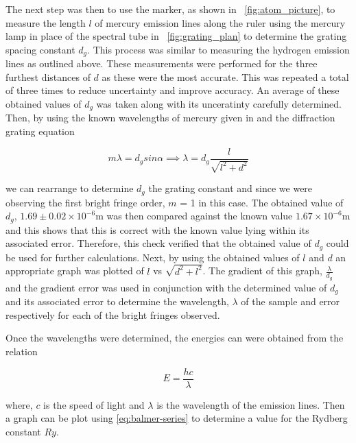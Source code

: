 \documentclass{article}
\newcommand{\figref}[2][\figurename~]{#1\ref{#2}}
\begin{document}
\vspace{2mm}
\noindent
The next step was then to use the marker, as shown in \figref{fig:atom_picture}, to measure the length $l$ of mercury emission lines along the ruler using the mercury lamp in place of the spectral tube in \figref{fig:grating_plan} to determine the grating spacing constant $d_g$. This process was similar to measuring the hydrogen emission lines as outlined above. These measurements were performed for the three furthest distances of $d$ as these were the most accurate. This was repeated a total of three times to reduce uncertainty and improve accuracy. An average of these obtained values of $d_g$ was taken along with its unceratinty carefully determined. Then, by using the known wavelengths of mercury given in \cite{Paper01} and the diffraction grating equation 

\begin{equation}
\label{eq:grating-equation}
m\lambda = d_gsin\alpha \implies \lambda = d_g\frac{l}{\sqrt{l^2+d^2}}
\end{equation}

\vspace{2mm}
\noindent
we can rearrange to determine $d_g$ the grating constant and since we were observing the first bright fringe order, $m$ = 1 in this case. The obtained value of $d_g$, $1.69 \pm 0.02 \times 10^{-6}$m was then compared against the known value $1.67 \times 10 ^{-6}$m \cite{Paper01} and this shows that this is correct with the known value lying within its associated error. Therefore, this check verified that the obtained value of $d_g$ could be used for further calculations. Next, by using the obtained values of $l$ and $d$ an appropriate graph was plotted of $l$ vs $\sqrt{d^2 + l^2}$. The gradient of this graph, $\frac{\lambda}{d_g}$ and the gradient error was used in conjunction with the determined value of $d_g$ and its associated error to determine the wavelength, $\lambda$ of the sample and error respectively for each of the bright fringes observed.

\vspace{2mm}
\noindent
Once the wavelengths were determined, the energies can were obtained from the relation 

\begin{equation}
\label{eq:energy-wavelength}
E = \frac{hc}{\lambda}
\end{equation}

\vspace{2mm}
\noindent
where, $c$ is the speed of light and $\lambda$ is the wavelength of the emission lines. Then a graph can be plot using \eqref{eq:balmer-series} to determine a value for the Rydberg constant $Ry$.
\end{document}
